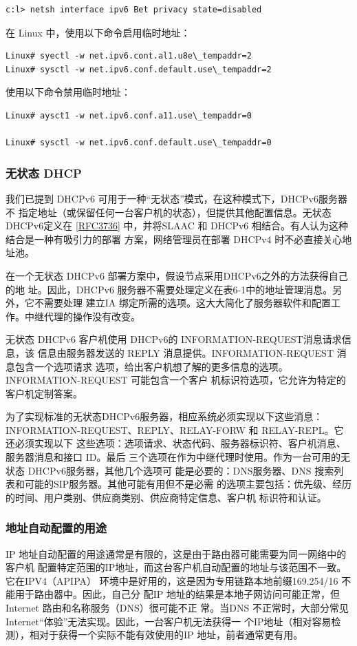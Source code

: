 \begin{verbatim}
c:l> netsh interface ipv6 Bet privacy state=disabled
\end{verbatim}

在 Linux 中，使用以下命令启用临时地址：
\begin{verbatim}
Linux# syectl -w net.ipv6.cont.al1.u8e\_tempaddr=2
Linux# sysctl -w net.ipv6.conf.default.use\_tempaddr=2
\end{verbatim}

使用以下命令禁用临时地址：
\begin{verbatim}
Linux# aysct1 -w net.ipv6.conf.a11.use\_tempaddr=0

Linux# sysctl -w net.ipv6.conf.default.use\_tempaddr=0
\end{verbatim}

\subsubsection{无状态 DHCP}
我们已提到 DHCPv6 可用于一种“无状态”模式，在这种模式下，DHCPv6服务器不
指定地址（或保留任何一台客户机的状态），但提供其他配置信息。无状态 DHCPv6定义在
\href{https://www.rfc-editor.org/rfc/rfc3736}{\href{https://www.rfc-editor.org/rfc/rfc3736}{[RFC3736]}} 中，并将SLAAC 和 DHCPv6 相结合。有人认为这种结合是一种有吸引力的部署
方案，网络管理员在部署 DHCPv4 时不必直接关心地址池。

在一个无状态 DHCPv6 部署方案中，假设节点采用DHCPv6之外的方法获得自己的地
址。因此，DHCPv6 服务器不需要处理定义在表6-1中的地址管理消息。另外，它不需要处理
建立IA 绑定所需的选项。这大大简化了服务器软件和配置工作。中继代理的操作没有改变。

无状态 DHCPv6 客户机使用 DHCPv6的 INFORMATION-REQUEST消息请求信息，该
信息由服务器发送的 REPLY 消息提供。INFORMATION-REQUEST 消息包含一个选项请求
选项，给出客户机想了解的更多信息的选项。INFORMATION-REQUEST 可能包含一个客户
机标识符选项，它允许为特定的客户机定制答案。

为了实现标准的无状态DHCPv6服务器，相应系统必须实现以下这些消息：
INFORMATION-REQUEST、REPLY、RELAY-FORW 和 RELAY-REPL。它还必须实现以下
这些选项：选项请求、状态代码、服务器标识符、客户机消息、服务器消息和接口 ID。最后
三个选项在作为中继代理时使用。作为一台可用的无状态 DHCPv6服务器，其他几个选项可
能是必要的：DNS服务器、DNS 搜索列表和可能的SIP服务器。其他可能有用但不是必需
的选项主要包括：优先级、经历的时间、用户类别、供应商类别、供应商特定信息、客户机
标识符和认证。

\subsubsection{地址自动配置的用途}
IP 地址自动配置的用途通常是有限的，这是由于路由器可能需要为同一网络中的客户机
配置特定范围的IP地址，而这台客户机自动配置的地址与该范围不一致。它在IPV4（APIPA）
环境中是好用的，这是因为专用链路本地前缀169.254/16 不能用于路由器中。因此，自己分
配IP 地址的结果是本地子网访问可能正常，但 Internet 路由和名称服务（DNS）很可能不正
常。当DNS 不正常时，大部分常见 Internet“体验”无法实现。因此，一台客户机无法获得一
个IP地址（相对容易检测），相对于获得一个实际不能有效使用的IP 地址，前者通常更有用。

